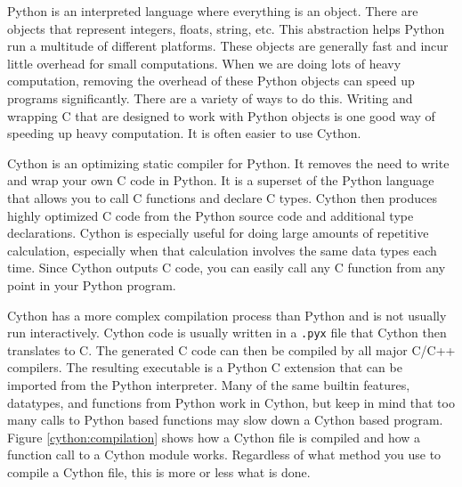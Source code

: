 \label{lab:Cython}

Python is an interpreted language where everything is an object.
There are objects that represent integers, floats, string, etc.
This abstraction helps Python run a multitude of different platforms.
These objects are generally fast and incur little overhead for small computations.
When we are doing lots of heavy computation, removing the overhead of these Python objects can speed up programs significantly.
There are a variety of ways to do this.
Writing and wrapping C that are designed to work with Python objects is one good way of speeding up heavy computation.
It is often easier to use Cython.

Cython is an optimizing static compiler for Python.  It removes the need to write and wrap your own C code in Python.
It is a superset of the Python language that allows you to call C functions and declare C types.
Cython then produces highly optimized C code from the Python source code and additional type declarations.
Cython is especially useful for doing large amounts of repetitive calculation, especially when that calculation involves the same data types each time.
Since Cython outputs C code, you can easily call any C function from any point in your Python program.

Cython has a more complex compilation process than Python and is not usually run interactively.
Cython code is usually written in a \texttt{.pyx} file that Cython then translates to C.
The generated C code can then be compiled by all major C/C++ compilers.
The resulting executable is a Python C extension that can be imported from the Python interpreter.
Many of the same builtin features, datatypes, and functions from Python work in Cython, but keep in mind that too many calls to Python based functions may slow down a Cython based program.
Figure \ref{cython:compilation} shows how a Cython file is compiled and how a function call to a Cython module works.
Regardless of what method you use to compile a Cython file, this is more or less what is done.

